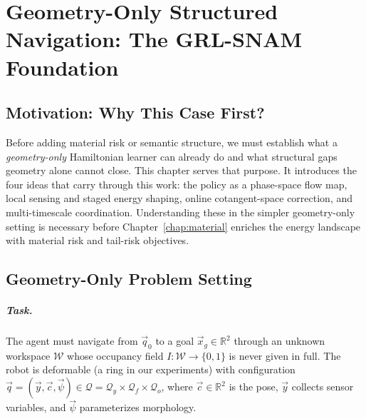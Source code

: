 
\chapter{Geometry-Only Structured Navigation: The GRL-SNAM Foundation}
\label{chap:grlsnam}

\providecommand{\Ham}{\mathcal{H}}
\providecommand{\Potential}{\mathcal{R}}
\providecommand{\PhaseState}{z}
\providecommand{\Pos}{q}
\providecommand{\Mom}{p}
\providecommand{\Mass}{\mathrm{M}}
\providecommand{\J}{\mathbb{J}}

\section{Motivation: Why This Case First?}
\label{sec:ch3:motivation}

Before adding material risk or semantic structure, we must
establish what a \emph{geometry-only} Hamiltonian learner can already
do and what structural gaps geometry alone cannot close.
This chapter serves that purpose.
It introduces the four ideas that carry through this work:
the policy as a phase-space flow map, local sensing and staged
energy shaping, online cotangent-space correction, and
multi-timescale coordination.
Understanding these in the simpler geometry-only setting is necessary
before Chapter~\ref{chap:material} enriches the energy landscape with
material risk and tail-risk objectives.

\section{Geometry-Only Problem Setting}
\label{sec:ch3:setting}

\paragraph{Task.}
The agent must navigate from $\vec{q}_0$ to a goal
$\vec{x}_g \in \mathbb{R}^2$ through an unknown workspace
$\mathcal{W}$ whose occupancy field $I : \mathcal{W}\to\{0,1\}$ is
never given in full.
The robot is deformable (a ring in our experiments) with configuration
$\vec{q} = (\vec{y},\vec{c},\vec{\psi}) \in \mathcal{Q}
= \mathcal{Q}_y \times \mathcal{Q}_f \times \mathcal{Q}_o$,
where $\vec{c}\in\mathbb{R}^2$ is the pose,
$\vec{y}$ collects sensor variables, and
$\vec{\psi}$ parameterizes morphology.

